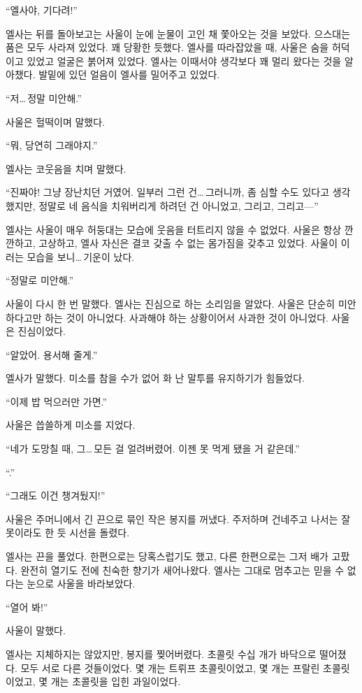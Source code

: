``엘사야, 기다려!''

엘사는 뒤를 돌아보고는 사울이 눈에 눈물이 고인 채 쫓아오는 것을 보았다. 으스대는 품은 모두 사라져 있었다. 꽤 당황한 듯했다. 엘사를 따라잡았을 때, 사울은 숨을 허덕이고 있었고 얼굴은 붉어져 있었다. 엘사는 이때서야 생각보다 꽤 멀리 왔다는 것을 알아챘다. 발밑에 있던 얼음이 엘사를 밀어주고 있었다.

``저\ldots\,정말 미안해.''

사울은 헐떡이며 말했다.

``뭐, 당연히 그래야지.''

엘사는 코웃음을 치며 말했다.

``진짜야! 그냥 장난치던 거였어. 일부러 그런 건\ldots\,그러니까, 좀 심할 수도 있다고 생각했지만, 정말로 네 음식을 치워버리게 하려던 건 아니었고, 그리고, 그리고—''

엘사는 사울이 매우 허둥대는 모습에 웃음을 터트리지 않을 수 없었다. 사울은 항상 깐깐하고, 고상하고, 엘사 자신은 결코 갖출 수 없는 몸가짐을 갖추고 있었다. 사울이 이러는 모습을 보니\ldots\,기운이 났다.

``정말로 미안해.''

사울이 다시 한 번 말했다. 엘사는 진심으로 하는 소리임을 알았다. 사울은 단순히 미안하다고만 하는 것이 아니었다. 사과해야 하는 상황이어서 사과한 것이 아니었다. 사울은 진심이었다.

``알았어. 용서해 줄게.''

엘사가 말했다. 미소를 참을 수가 없어 화 난 말투를 유지하기가 힘들었다.

``이제 밥 먹으러만 가면.''

사울은 씁쓸하게 미소를 지었다.

``네가 도망칠 때, 그\ldots\,모든 걸 얼려버렸어. 이젠 못 먹게 됐을 거 같은데.''

``.''

``그래도 이건 챙겨뒀지!''

사울은 주머니에서 긴 끈으로 묶인 작은 봉지를 꺼냈다. 주저하며 건네주고 나서는 잘못이라도 한 듯 시선을 돌렸다.

엘사는 끈을 풀었다. 한편으로는 당혹스럽기도 했고, 다른 한편으로는 그저 배가 고팠다. 완전히 열기도 전에 친숙한 향기가 새어나왔다. 엘사는 그대로 멈추고는 믿을 수 없다는 눈으로 사울을 바라보았다.

``열어 봐!''

사울이 말했다.

엘사는 지체하지는 않았지만, 봉지를 찢어버렸다. 초콜릿 수십 개가 바닥으로 떨어졌다. 모두 서로 다른 것들이었다. 몇 개는 트뤼프 초콜릿이었고, 몇 개는 프랄린 초콜릿이었고, 몇 개는 초콜릿을 입힌 과일이었다.

